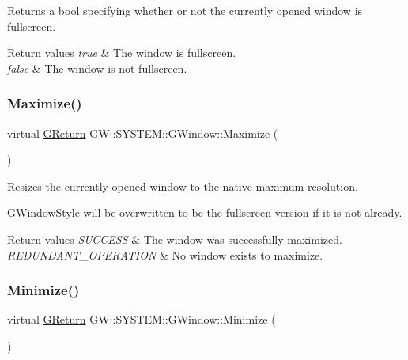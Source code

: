 Returns a bool specifying whether or not the currently opened window is fullscreen. 


\begin{DoxyRetVals}{Return values}
{\em true} & The window is fullscreen. \\
\hline
{\em false} & The window is not fullscreen. \\
\hline
\end{DoxyRetVals}
\mbox{\label{class_g_w_1_1_s_y_s_t_e_m_1_1_g_window_a06b5f092e742baca82a0bfc2cbaef153}} 
\subsubsection{\texorpdfstring{Maximize()}{Maximize()}}
{\footnotesize\ttfamily virtual \mbox{\hyperlink{namespace_g_w_a67a839e3df7ea8a5c5686613a7a3de21}{G\+Return}} G\+W\+::\+S\+Y\+S\+T\+E\+M\+::\+G\+Window\+::\+Maximize (\begin{DoxyParamCaption}{ }\end{DoxyParamCaption})\hspace{0.3cm}{\ttfamily [pure virtual]}}



Resizes the currently opened window to the native maximum resolution. 

G\+Window\+Style will be overwritten to be the fullscreen version if it is not already.


\begin{DoxyRetVals}{Return values}
{\em S\+U\+C\+C\+E\+SS} & The window was successfully maximized. \\
\hline
{\em R\+E\+D\+U\+N\+D\+A\+N\+T\+\_\+\+O\+P\+E\+R\+A\+T\+I\+ON} & No window exists to maximize. \\
\hline
\end{DoxyRetVals}
\mbox{\label{class_g_w_1_1_s_y_s_t_e_m_1_1_g_window_a2cced61a323dac10535904c3899563d8}} 
\subsubsection{\texorpdfstring{Minimize()}{Minimize()}}
{\footnotesize\ttfamily virtual \mbox{\hyperlink{namespace_g_w_a67a839e3df7ea8a5c5686613a7a3de21}{G\+Return}} G\+W\+::\+S\+Y\+S\+T\+E\+M\+::\+G\+Window\+::\+Minimize (\begin{DoxyParamCaption}{ }\end{DoxyParamCaption})\hspace{0.3cm}{\ttfamily [pure virtual]}}



